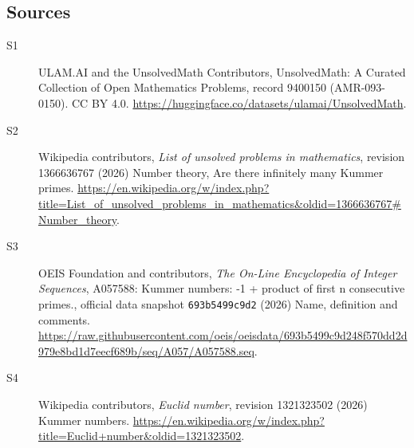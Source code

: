 \documentclass[11pt]{article}
\begin{document}
\subsection{Sources}
\begin{description}
\item[\hypertarget{source:9400150:1}{S1}] ULAM.AI and the UnsolvedMath Contributors, UnsolvedMath: A Curated Collection of Open Mathematics Problems, record 9400150 (AMR-093-0150). CC BY 4.0. \url{https://huggingface.co/datasets/ulamai/UnsolvedMath}.
\item[\hypertarget{source:9400150:2}{S2}] Wikipedia contributors, \emph{List of unsolved problems in mathematics}, revision 1366636767 (2026) Number theory, Are there infinitely many Kummer primes. \url{https://en.wikipedia.org/w/index.php?title=List_of_unsolved_problems_in_mathematics&oldid=1366636767#Number_theory}.
\item[\hypertarget{source:9400150:3}{S3}] OEIS Foundation and contributors, \emph{The On-Line Encyclopedia of Integer Sequences}, A057588: Kummer numbers: -1 + product of first n consecutive primes., official data snapshot \texttt{693b5499c9d2} (2026) Name, definition and comments. \url{https://raw.githubusercontent.com/oeis/oeisdata/693b5499c9d248f570dd2d979e8bd1d7eecf689b/seq/A057/A057588.seq}.
\item[\hypertarget{source:9400150:4}{S4}] Wikipedia contributors, \emph{Euclid number}, revision 1321323502 (2026) Kummer numbers. \url{https://en.wikipedia.org/w/index.php?title=Euclid+number&oldid=1321323502}.
\end{description}
\label{end:9400150}
\end{document}
